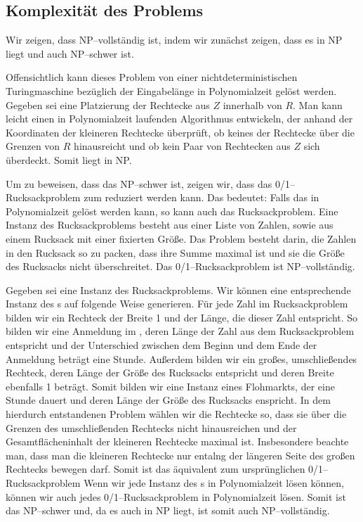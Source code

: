 \subsection{Komplexität des Problems}


Wir zeigen, dass \fp{} NP--vollständig ist, indem wir zunächst zeigen, dass
es in NP liegt und auch NP--schwer ist.

Offensichtlich kann dieses Problem von einer nichtdeterministischen
Turingmaschine bezüglich der Eingabelänge in Polynomialzeit gelöst werden.
Gegeben sei eine Platzierung der Rechtecke aus $Z$ innerhalb von $R$. 
Man kann leicht einen in Polynomialzeit laufenden Algorithmus entwickeln, der
anhand der Koordinaten der kleineren Rechtecke überprüft, ob keines
der Rechtecke über die Grenzen von $R$ hinausreicht und ob
kein Paar von Rechtecken aus $Z$ sich überdeckt.  
Somit liegt \fp{} in NP.

Um zu beweisen, dass das \fp{} NP--schwer ist, zeigen wir, dass
das 0/1--Rucksackproblem zum \fp{} reduziert werden kann.
Das bedeutet: Falls das \fp{} in Polynomialzeit gelöst werden kann,
so kann auch das Rucksackproblem.
Eine Instanz des Rucksackproblems besteht aus einer Liste von Zahlen,
sowie aus einem Rucksack mit einer fixierten Größe.
Das Problem besteht darin, die Zahlen in den Rucksack 
so zu packen, dass ihre Summe maximal ist und sie die Größe des Rucksacks nicht überschreitet.
Das 0/1--Rucksackproblem ist NP--vollständig.\cite{knapsack}


Gegeben sei eine Instanz des Rucksackproblems.
Wir können eine entsprechende Instanz des \fp s auf folgende Weise generieren.
Für jede Zahl im Rucksackproblem bilden wir ein Rechteck der Breite 1 und der Länge, die 
dieser Zahl entspricht.
So bilden wir eine Anmeldung im \fp{}, deren Länge der
Zahl aus dem Rucksackproblem entspricht und der Unterschied zwischen
dem Beginn und dem Ende der Anmeldung beträgt eine Stunde.
Außerdem bilden wir ein großes, umschließendes Rechteck, deren Länge der Größe des Rucksacks entspricht
und deren Breite ebenfalls 1 beträgt.
Somit bilden wir eine Instanz eines Flohmarkts, der eine Stunde dauert und deren 
Länge der Größe des Rucksacks enspricht.
In dem hierdurch entstandenen Problem wählen wir die Rechtecke so, 
dass sie über die Grenzen des umschließenden Rechtecks nicht hinausreichen
und der Gesamtflächeninhalt der kleineren Rechtecke maximal ist. 
Insbesondere beachte man, dass man die kleineren Rechtecke nur entalng der längeren
Seite des großen Rechtecks bewegen darf.
Somit ist das \fp{} äquivalent zum ursprünglichen 0/1--Rucksackproblem
Wenn wir jede Instanz des \fp s in Polynomialzeit lösen können,
können wir auch jedes 0/1--Rucksackproblem in Polynomialzeit lösen.
Somit ist das \fp{} NP--schwer und, da es auch in NP liegt, 
ist somit auch NP--vollständig.


